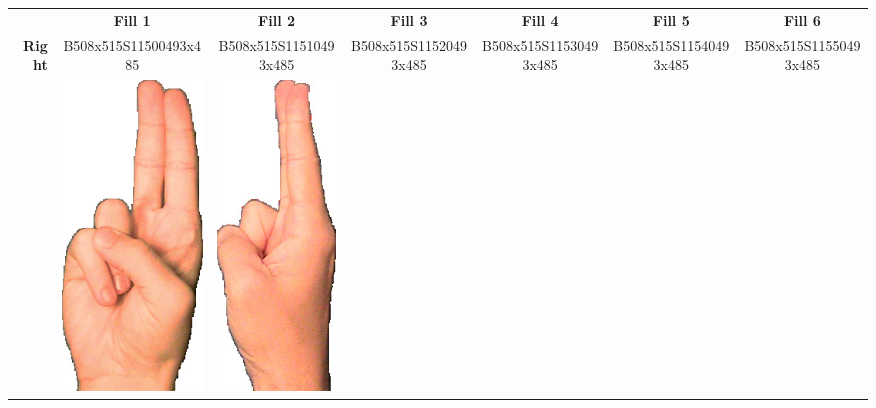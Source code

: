 \documentclass{article}
\begin{document}
\begin{center}
\begin{tabular}{r*{6}{c}}
&\textbf{Fill 1}&\textbf{Fill 2}&\textbf{Fill 3}&\textbf{Fill 4}&\textbf{Fill 5}&\textbf{Fill 6}\\
\multirow{2}{*}{\textbf{Right}}&
B508x515S11500493x485&
B508x515S11510493x485&
B508x515S11520493x485&
B508x515S11530493x485&
B508x515S11540493x485&
B508x515S11550493x485\\
&
\includegraphics[scale=0.1]{images/02-03-1.jpg}&
\includegraphics[scale=0.1]{images/02-03-2.jpg}&

\end{tabular}
\end{center}
\end{document}
